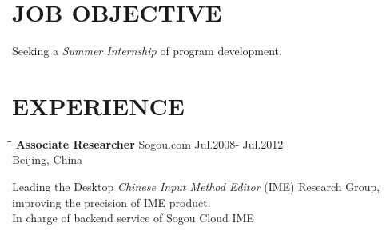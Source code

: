 \documentclass{res}
\begin{document}
 


\address{\bf  ADDRESS\\Donald Bren Hall, Room 2062\\University of California,Irvine\\Irvine,CA 92967}
\address{\bf  CONTACT\\jianfeng.jia@gmail.com\\jianfeng.jia@uci.edu\\(949) 678-9893}
                                  
\begin{resume}

\section{JOB OBJECTIVE}          
    Seeking a \emph{Summer Internship} of program development.

\section{EXPERIENCE}
   \vspace{-0.1in}	
   \begin{tabbing}
   \hspace{2.3in}\= \hspace{2.6in}\= \kill %
    {\bf Associate Researcher} \>Sogou.com     \>Jul.2008- Jul.2012\\
                             \>Beijing, China
   \end{tabbing}\vspace{-20pt}      %
   Leading the Desktop \emph{Chinese Input Method Editor} (IME) Research Group,
    improving the precision of IME product. \\
    In charge of backend service of Sogou Cloud IME


\end{resume}
\end{document}
